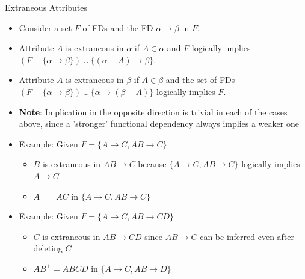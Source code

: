 \documentclass[aspectratio=169, xcolor=dvipsnames]{beamer}
\begin{document}
\begin{frame}{Extraneous Attributes}
    \begin{itemize}[<+->]
        \item Consider a set $F$ of FDs and the FD $\alpha \rightarrow \beta$ in $F$.
        \item Attribute $A$ is extraneous in $\alpha$ if $A \in \alpha$ and $F$ logically implies $(F - \{\alpha \rightarrow \beta\}) \cup \{(\alpha - A) \rightarrow \beta\}$.
        \item Attribute $A$ is extraneous in $\beta$ if $A \in \beta$ and the set of FDs $(F - \{\alpha \rightarrow \beta\}) \cup \{\alpha \rightarrow (\beta - A)\}$ logically implies $F$.
        \item \textbf{Note}: Implication in the opposite direction is trivial in each of the cases above, since a 'stronger' functional dependency always implies a weaker one
        \item Example: Given $F = \{A \rightarrow C, AB \rightarrow C\}$
        \begin{itemize}
            \item[$\triangleright$] $B$ is extraneous in $AB \rightarrow C$ because $\{A \rightarrow C, AB \rightarrow C\}$ logically implies $A \rightarrow C$
            \item[$\triangleright$] $A^+ = AC$ in $\{A \rightarrow C, AB \rightarrow C\}$
        \end{itemize}
        \item Example: Given $F = \{A \rightarrow C, AB \rightarrow CD\}$
        \begin{itemize}
            \item[$\triangleright$] $C$ is extraneous in $AB \rightarrow CD$ since $AB \rightarrow C$ can be inferred even after deleting $C$
            \item[$\triangleright$] $AB^+ = ABCD$ in $\{A \rightarrow C, AB \rightarrow D\}$
        \end{itemize}
    \end{itemize}
\end{frame}
\end{document}
